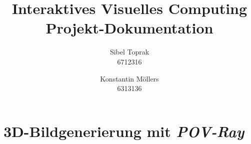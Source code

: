\documentclass[a4paper,12pt]{article}
\title{\textbf{Interaktives Visuelles Computing}\\Projekt-Dokumentation}
\author{Sibel Toprak\\6712316 \and Konstantin M\"ollers\\6313136}
\def\fremdw#1{{\em #1}\xspace}
\def\Povray{\fremdw{POV-Ray}}
\begin{document}
	\renewcommand{\refname}{Referenzen}
	\maketitle	
	
	
	
	\section{3D-Bildgenerierung mit \Povray}
	
	
	
	
	
	
	
	
	
	\nocite{*}
	
	
\end{document}

